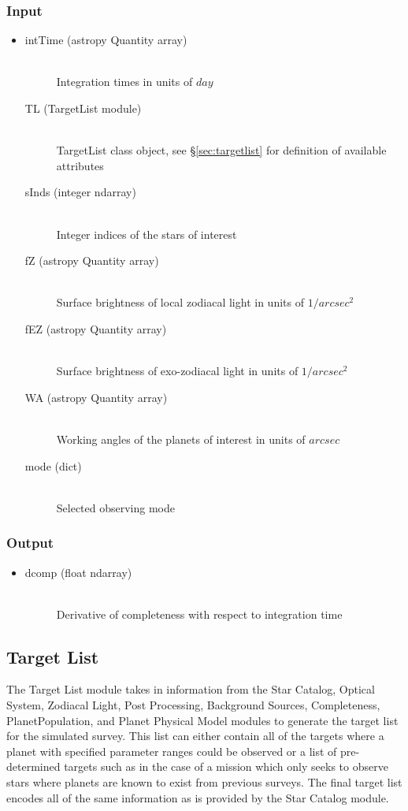 \documentclass[cleanfoot]{asme2ej}
\begin{document}
\subsubsection*{Input}
\begin{itemize}
\item 
\begin{description}
    \item[intTime (astropy Quantity array)] \hfill \\ Integration times in units of $ day $
    \item[TL (TargetList module)] \hfill \\ TargetList class object, see \S\ref{sec:targetlist} for definition of available attributes
    \item[sInds (integer ndarray)] \hfill \\ Integer indices of the stars of interest
    \item[fZ (astropy Quantity array)] \hfill \\ Surface brightness of local zodiacal light in units of $ 1/arcsec^2 $
    \item[fEZ (astropy Quantity array)] \hfill \\ Surface brightness of exo-zodiacal light in units of $ 1/arcsec^2 $
    \item[WA (astropy Quantity array)] \hfill \\ Working angles of the planets of interest in units of $ arcsec $
    \item[mode (dict)] \hfill \\ Selected observing mode
\end{description}
\end{itemize}
\subsubsection*{Output}
\begin{itemize}
\item 
\begin{description}
    \item[dcomp (float ndarray)] \hfill \\
        Derivative of completeness with respect to integration time
\end{description}
\end{itemize}


\subsection{Target List}
The Target List module takes in information from the Star Catalog, Optical System, Zodiacal Light, Post Processing, Background Sources, Completeness, PlanetPopulation, and Planet Physical Model modules to generate the target list for the simulated survey.  This list can either contain all of the targets where a planet with specified parameter ranges could be observed or a list of pre-determined targets such as in the case of a mission which only seeks to observe stars where planets are known to exist from previous surveys.  The final target list encodes all of the same information as is provided by the Star Catalog module.
\end{document}
